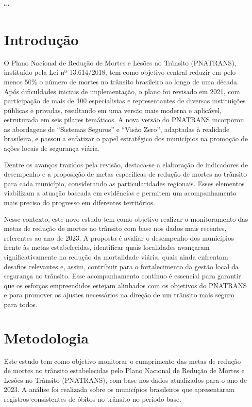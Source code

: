 \documentclass[
  letterpaper,
  DIV=11,
  numbers=noendperiod]{scrreprt}
\begin{document}
```


\chapter{Introdução}\label{introduuxe7uxe3o}

O Plano Nacional de Redução de Mortes e Lesões no Trânsito (PNATRANS),
instituído pela Lei nº 13.614/2018, tem como objetivo central reduzir em
pelo menos 50\% o número de mortes no trânsito brasileiro ao longo de
uma década. Após dificuldades iniciais de implementação, o plano foi
revisado em 2021, com participação de mais de 100 especialistas e
representantes de diversas instituições públicas e privadas, resultando
em uma versão mais moderna e aplicável, estruturada em seis pilares
temáticos. A nova versão do PNATRANS incorporou as abordagens de
``Sistemas Seguros'' e ``Visão Zero'', adaptadas à realidade brasileira,
e passou a enfatizar o papel estratégico dos municípios na promoção de
ações locais de segurança viária.

Dentre os avanços trazidos pela revisão, destaca-se a elaboração de
indicadores de desempenho e a proposição de metas específicas de redução
de mortes no trânsito para cada município, considerando as
particularidades regionais. Esses elementos viabilizam a atuação baseada
em evidências e permitem um acompanhamento mais preciso do progresso em
diferentes territórios.

Nesse contexto, este novo estudo tem como objetivo realizar o
monitoramento das metas de redução de mortes no trânsito com base nos
dados mais recentes, referentes ao ano de 2023. A proposta é avaliar o
desempenho dos municípios frente às metas estabelecidas, identificar
quais localidades avançaram significativamente na redução da mortalidade
viária, quais ainda enfrentam desafios relevantes e, assim, contribuir
para o fortalecimento da gestão local da segurança no trânsito. Esse
acompanhamento contínuo é essencial para garantir que os esforços
empreendidos estejam alinhados com os objetivos do PNATRANS e para
promover os ajustes necessários na direção de um trânsito mais seguro
para todos.


\chapter{Metodologia}\label{metodologia}

Este estudo tem como objetivo monitorar o cumprimento das metas de
redução de mortes no trânsito estabelecidas pelo Plano Nacional de
Redução de Mortes e Lesões no Trânsito (PNATRANS), com base nos dados
atualizados para o ano de 2023. A análise foi realizada sobre os
municípios brasileiros que apresentaram registros consistentes de óbitos
no trânsito no período base.
\end{document}
